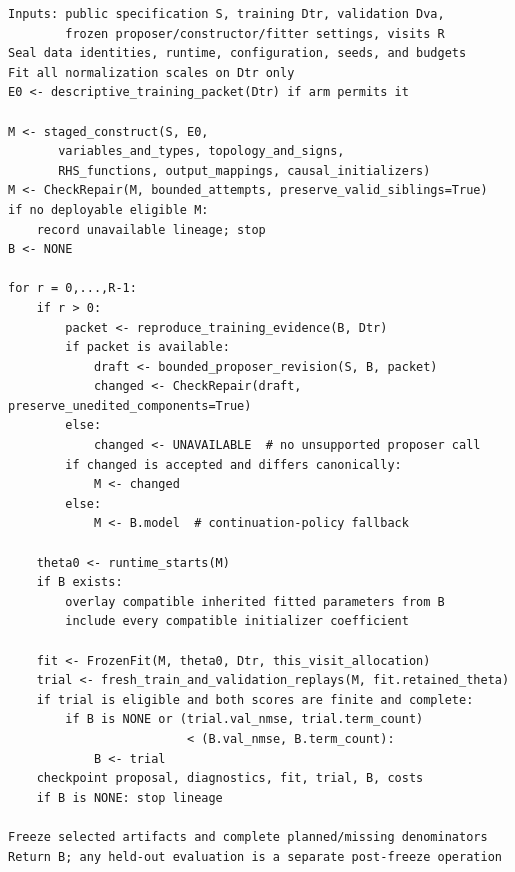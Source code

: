 \documentclass[11pt]{article}
\begin{document}
\noindent\begin{minipage}{\linewidth}
\begin{lstlisting}[basicstyle=\ttfamily\fontsize{9}{10.5}\selectfont,
caption={Current judge-free construction and continuation loop.}]
Inputs: public specification S, training Dtr, validation Dva,
        frozen proposer/constructor/fitter settings, visits R
Seal data identities, runtime, configuration, seeds, and budgets
Fit all normalization scales on Dtr only
E0 <- descriptive_training_packet(Dtr) if arm permits it

M <- staged_construct(S, E0,
       variables_and_types, topology_and_signs,
       RHS_functions, output_mappings, causal_initializers)
M <- CheckRepair(M, bounded_attempts, preserve_valid_siblings=True)
if no deployable eligible M:
    record unavailable lineage; stop
B <- NONE

for r = 0,...,R-1:
    if r > 0:
        packet <- reproduce_training_evidence(B, Dtr)
        if packet is available:
            draft <- bounded_proposer_revision(S, B, packet)
            changed <- CheckRepair(draft, preserve_unedited_components=True)
        else:
            changed <- UNAVAILABLE  # no unsupported proposer call
        if changed is accepted and differs canonically:
            M <- changed
        else:
            M <- B.model  # continuation-policy fallback

    theta0 <- runtime_starts(M)
    if B exists:
        overlay compatible inherited fitted parameters from B
        include every compatible initializer coefficient

    fit <- FrozenFit(M, theta0, Dtr, this_visit_allocation)
    trial <- fresh_train_and_validation_replays(M, fit.retained_theta)
    if trial is eligible and both scores are finite and complete:
        if B is NONE or (trial.val_nmse, trial.term_count)
                         < (B.val_nmse, B.term_count):
            B <- trial
    checkpoint proposal, diagnostics, fit, trial, B, costs
    if B is NONE: stop lineage

Freeze selected artifacts and complete planned/missing denominators
Return B; any held-out evaluation is a separate post-freeze operation
\end{lstlisting}
\end{minipage}
\par\medskip
\end{document}
